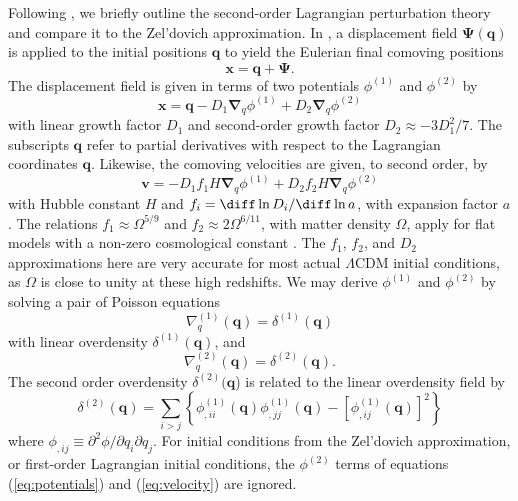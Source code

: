 Following \citet{2010MNRAS.403.1859J}, we briefly outline the second-order Lagrangian perturbation theory and compare it to the Zel'dovich approximation.  In \lpt, a displacement field $\boldsymbol{\Psi}(\boldsymbol{q})$ is applied to the initial positions $\boldsymbol{q}$ to yield the Eulerian final comoving positions
\begin{equation} \label{eq:displacement}
	\boldsymbol{x} = \boldsymbol{q} + \boldsymbol{\Psi}.
\end{equation}
The displacement field is given in terms of two potentials $\phi^{(1)}$ and $\phi^{(2)}$ by
\begin{equation} \label{eq:potentials}
	\boldsymbol{x} = \boldsymbol{q} - D_{1} \boldsymbol{\nabla}_{q} \phi^{(1)} + D_{2} \boldsymbol{\nabla}_{q} \phi^{(2)}
\end{equation}
with linear growth factor $D_{1}$ and second-order growth factor $D_{2} \approx -3 D_{1}^{2} / 7$.  The subscripts $\boldsymbol{q}$ refer to partial derivatives with respect to the Lagrangian coordinates $\boldsymbol{q}$.  Likewise, the comoving velocities are given, to second order, by
\begin{equation} \label{eq:velocity}
	\boldsymbol{v} =  - D_{1} f_{1} H \boldsymbol{\nabla}_{q} \phi^{(1)} + D_{2} f_{2} H \boldsymbol{\nabla}_{q} \phi^{(2)}
\end{equation}
with Hubble constant $H$ and $f_{i} = \diff\, \mathrm{ln}\, D_{i} / \diff\, \mathrm{ln}\, a$, with expansion factor $a$.  The relations $f_{1} \approx \Omega^{5/9}$ and $f_{2} \approx 2 \Omega^{6/11}$, with matter density $\Omega$, apply for flat models with a non-zero cosmological constant \citep{1995A&A...296..575B}.  The $f_{1}$, $f_{2}$, and $D_{2}$ approximations here are very accurate for most actual $\Lambda$CDM initial conditions, as $\Omega$ is close to unity at these high redshifts.  We may derive $\phi^{(1)}$ and $\phi^{(2)}$ by solving a pair of Poisson equations
\begin{equation} \label{eq:poisson1}
	\nabla_{q}^{(1)}(\boldsymbol{q}) = \delta^{(1)}(\boldsymbol{q})
\end{equation}
with linear overdensity $\delta^{(1)}(\boldsymbol{q})$, and
\begin{equation} \label{eq:poisson2}
	\nabla_{q}^{(2)}(\boldsymbol{q}) = \delta^{(2)}(\boldsymbol{q}).
\end{equation}
The second order overdensity $\delta^{(2)}(\boldsymbol{q}$) is related to the linear overdensity field by
\begin{equation} \label{eq:second-order_overdensity}
	\delta^{(2)}(\boldsymbol{q}) = \sum_{i > j} \left\{ \phi_{,ii}^{(1)}(\boldsymbol{q}) \phi_{,jj}^{(1)}(\boldsymbol{q}) - \left[ \phi_{,ij}^{(1)}(\boldsymbol{q}) \right]^{2} \right\}
\end{equation}
where $\phi_{,ij} \equiv \partial^{2} \phi / \partial q_{i} \partial q_{j}$.  For initial conditions from the Zel'dovich approximation, or first-order Lagrangian initial conditions, the $\phi^{(2)}$ terms of equations (\ref{eq:potentials}) and (\ref{eq:velocity}) are ignored.


